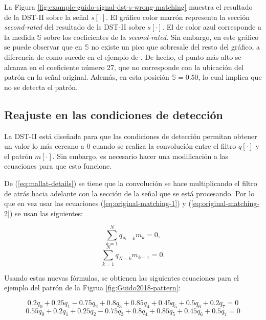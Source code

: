 La Figura \ref{fig:example-guido-signal-dst-s-wrong-matching} muestra el resultado de la DST-II sobre la señal $s[\cdot]$.
El gráfico color marrón representa la sección \textit{second-rated} del resultado de ls DST-II sobre $s[\cdot]$.
El de color azul corresponde a la medida $\mathbb{S}$ sobre los coeficientes de la \textit{second-rated}. 
Sin embargo, en este gráfico se puede observar que en $\mathbb{S}$ no existe un pico que sobresale del resto del
gráfico, a diferencia de como sucede en el ejemplo de \cite{Guido2018}. De hecho, el punto más alto
se alcanza en el coeficiente número 27, que no corresponde con la ubicación del patrón en la señal 
original. Además, en esta posición $\mathbb{S}=0.50$, lo cual implica que no se detecta el patrón.

\subsection{Reajuste en las condiciones de detección}

La DST-II está diseñada para que las condiciones de detección 
permitan obtener un valor lo más cercano a $0$ cuando se realiza la convolución entre el filtro $q[\cdot]$
y el patrón $m[\cdot]$. Sin embargo, es necesario hacer una modificación a las ecuaciones 
para que esto funcione.

De (\ref{eq:mallat-details}) se tiene que la convolución se hace multiplicando el filtro de atrás hacia adelante 
con la sección de la señal que se está procesando. Por lo que en vez usar las ecuaciones (\ref{eq:original-matching-1})
y (\ref{eq:original-matching-2}) se usan las siguientes:

\begin{equation}\label{eq:matching-1}
	\sum_{k=1}^{N} q_{N-k}m_{k} = 0,
\end{equation}
\begin{equation}\label{eq:matching-2}
	\sum_{k=1}^{N} q_{N-k}m_{k-1} = 0.
\end{equation}

Usando estas nuevas fórmulas, se obtienen las siguientes ecuaciones para el ejemplo del patrón de 
la Figrua \ref{fig:Guido2018-pattern}:

\begin{equation}
	0.2q_0 + 0.25q_1 - 0.75q_2 + 0.8q_3 + 0.85q_4 + 0.45q_5 + 0.5q_6 + 0.2q_7 = 0
\end{equation}
\begin{equation}
	0.55q_0 + 0.2q_1 + 0.25q_2 - 0.75q_3 + 0.8q_4 + 0.85q_5 + 0.45q_6 + 0.5q_7 = 0
\end{equation}


